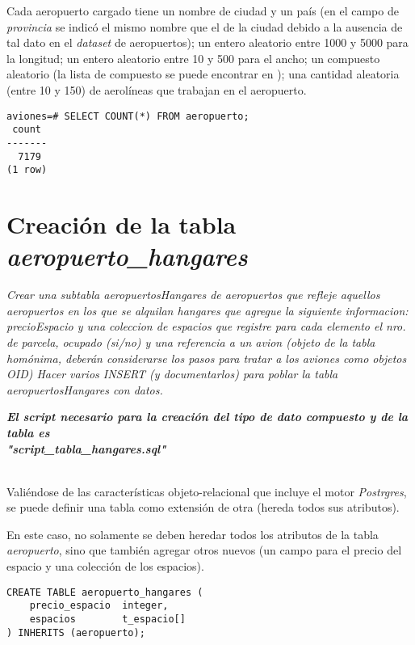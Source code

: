 Cada aeropuerto cargado tiene un nombre de ciudad y un país (en el campo de \emph{provincia} se indicó el mismo nombre que el de la ciudad debido a la ausencia de tal dato en el \emph{dataset} de aeropuertos); un entero aleatorio entre 1000 y 5000 para la longitud; un entero aleatorio entre 10 y 500 para el ancho; un compuesto aleatorio (la lista de compuesto se puede encontrar en \cite{compuestos}); una cantidad aleatoria (entre 10 y 150) de aerolíneas que trabajan en el aeropuerto.

\vspace*{5mm}
\lstset{style=sql}
\begin{lstlisting}
aviones=# SELECT COUNT(*) FROM aeropuerto;
 count 
-------
  7179
(1 row)
\end{lstlisting}

\section{Creación de la tabla \emph{aeropuerto\_hangares}}

\emph{Crear una subtabla aeropuertosHangares de aeropuertos que refleje aquellos aeropuertos en los que se alquilan hangares que agregue la siguiente informacion: precioEspacio y una coleccion de espacios que registre para cada elemento el nro. de parcela, ocupado (si/no) y una referencia a un avion (objeto de la tabla homónima, deberán considerarse los pasos para tratar a los aviones como objetos OID) Hacer varios INSERT (y documentarlos) para poblar la tabla aeropuertosHangares con datos.} 

\emph{\textbf{El script necesario para la creación del tipo de dato compuesto y de la tabla es \\ "script\_tabla\_hangares.sql"}} 

~\\


Valiéndose de las características objeto-relacional que incluye el motor \emph{Postrgres}, se puede definir una tabla como extensión de otra (hereda todos sus atributos).

En este caso, no solamente se deben heredar todos los atributos de la tabla \emph{aeropuerto}, sino que también agregar otros nuevos (un campo para el precio del espacio y una colección de los espacios). 

\vspace*{5mm}
\lstset{style=sql}
\begin{lstlisting}
CREATE TABLE aeropuerto_hangares (
    precio_espacio  integer,
    espacios        t_espacio[]
) INHERITS (aeropuerto);
\end{lstlisting}

